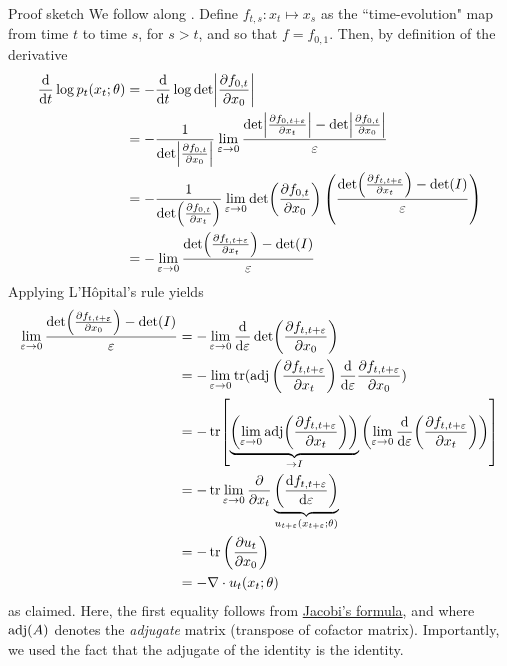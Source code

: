 \documentclass{scrartcl}
\begin{document}
\begin{proof*}{Proof sketch}
We follow along \citep{neural_ode}. Define $f_{t,s}: x_t \mapsto x_s$ as the ``time-evolution" map from time $t$ to time $s$, for $s > t$, and so that $f = f_{0,1}$. Then, by definition of the derivative
\begin{align*}
    \frac{\d}{\d t} \log p_t(x_t;\theta) &= - \frac{\d}{\d t} \log \det\abs*{\pdv{f_{0,t}}{x_0}}\\
    &= - \frac{1}{\det\abs*{\pdv{f_{0,t}}{x_0}}}\lim_{\varepsilon \to 0} \frac{\det\abs*{\pdv{f_{0,t + \varepsilon}}{x_t}} - \det\abs*{\pdv{f_{0,t}}{x_0}}}{\varepsilon}\\
    &= - \frac{1}{\det\!\left(\pdv{f_{0,t}}{x_t}\right)}
   \lim_{\varepsilon \to 0}
   \det\!\left(\pdv{f_{0,t}}{x_0}\right)
   \left(
      \frac{
        \det\!\left(\pdv{f_{t,t+\varepsilon}}{x_t}\right)
        - \det(I)
      }{\varepsilon}
   \right)\\
   &= -\lim_{\varepsilon \to 0}
      \frac{
        \det\!\left(\pdv{f_{t,t+\varepsilon}}{x_t}\right)
        - \det(I)
      }{\varepsilon}
\end{align*}
Applying L'Hôpital's rule yields
\begin{align*}
    \lim_{\varepsilon \to 0}
    \frac{
      \det\!\left(\pdv{f_{t,t+\varepsilon}}{x_0}\right)
      - \det(I)
    }{\varepsilon} &= -\lim_{\varepsilon \to 0}
    \frac{\d}{\d \varepsilon}
      \det\!\left(\pdv{f_{t,t+\varepsilon}}{x_0}\right)\\
      &= - \lim_{\varepsilon \to 0} \tr(\adj\left(\pdv{f_{t,t+\varepsilon}}{x_t}\right)\frac{\d}{\d \varepsilon}\pdv{f_{t,t+\varepsilon}}{x_0})\\
      &= - \tr\!\left[
        \underbrace{\left(
            \lim_{\varepsilon \to 0}
          \adj\!\left( \pdv{f_{t,t+\varepsilon}}{x_t} \right)
        \right)}_{\to I}
        \left(
            \lim_{\varepsilon \to 0}
          \frac{\d}{\d\varepsilon}\!\left( \pdv{f_{t,t+\varepsilon}}{x_t} \right)
        \right)
    \right]\\
    &= - \tr
        \lim_{\varepsilon \to 0}
        \frac{\partial}{\partial x_t}
        \underbrace{
          \left(
            \frac{\d f_{t,t+\varepsilon}}{\d \varepsilon}
          \right)
        }_{u_{t+\varepsilon}(x_{t+\varepsilon};\theta)}\\
    &= -\tr \left(\frac{\partial u_t}{\partial x_0}\right)\\
    &= - \nabla \cdot u_t(x_t; \theta)
\end{align*}
as claimed. Here, the first equality follows from \href{https://en.wikipedia.org/wiki/Jacobi%27s_formula}{Jacobi's formula}, and where $\operatorname{adj}(A)$ denotes the \textit{adjugate} matrix (transpose of cofactor matrix). Importantly, we used the fact that the adjugate of the identity is the identity.
\end{proof*}
\end{document}
